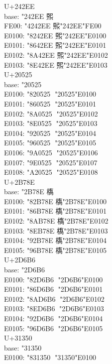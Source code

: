 \documentclass{ujarticle}
\begin{document}
\begin{multicols*}{4}
\newcolumn
U+242EE\\
base: \kchar"242EE 𤋮\\
FE00: \kchar"4242EE  𤋮︀\kchar"242EE\kchar"FE00\\
E0100: \kchar"8242EE 𤋮󠄀\kchar"242EE\kchar"E0100\\
E0101: \kchar"8642EE 𤋮󠄁\kchar"242EE\kchar"E0101\\
E0102: \kchar"8A42EE 𤋮󠄂\kchar"242EE\kchar"E0102\\
E0103: \kchar"8E42EE 𤋮󠄃\kchar"242EE\kchar"E0103\\
\VS
U+20525\\
base: \kchar"20525 𠔥\\
E0100: \kchar"820525 𠔥󠄀\kchar"20525\kchar"E0100\\
E0101: \kchar"860525 𠔥󠄁\kchar"20525\kchar"E0101\\
E0102: \kchar"8A0525 𠔥󠄂\kchar"20525\kchar"E0102\\
E0103: \kchar"8E0525 𠔥󠄃\kchar"20525\kchar"E0103\\
E0104: \kchar"920525 𠔥󠄄\kchar"20525\kchar"E0104\\
E0105: \kchar"960525 𠔥󠄅\kchar"20525\kchar"E0105\\
E0106: \kchar"9A0525 𠔥󠄆\kchar"20525\kchar"E0106\\
E0107: \kchar"9E0525 𠔥󠄇\kchar"20525\kchar"E0107\\
E0108: \kchar"A20525 𠔥󠄈\kchar"20525\kchar"E0108\\
\VS
U+2B78E\\
base: \kchar"2B78E 𫞎\\
E0100: \kchar"82B78E 𫞎󠄀\kchar"2B78E\kchar"E0100\\
E0101: \kchar"86B78E 𫞎󠄁\kchar"2B78E\kchar"E0101\\
E0102: \kchar"8AB78E 𫞎󠄂\kchar"2B78E\kchar"E0102\\
E0103: \kchar"8EB78E 𫞎󠄃\kchar"2B78E\kchar"E0103\\
E0104: \kchar"92B78E 𫞎󠄄\kchar"2B78E\kchar"E0104\\
E0105: \kchar"96B78E 𫞎󠄅\kchar"2B78E\kchar"E0105\\
\VS
U+2D6B6\\
base: \kchar"2D6B6 𭚶\\
E0100: \kchar"82D6B6 𭚶󠄀\kchar"2D6B6\kchar"E0100\\
E0101: \kchar"86D6B6 𭚶󠄁\kchar"2D6B6\kchar"E0101\\
E0102: \kchar"8AD6B6 𭚶󠄂\kchar"2D6B6\kchar"E0102\\
E0103: \kchar"8ED6B6 𭚶󠄃\kchar"2D6B6\kchar"E0103\\
E0104: \kchar"92D6B6 𭚶󠄄\kchar"2D6B6\kchar"E0104\\
E0105: \kchar"96D6B6 𭚶󠄅\kchar"2D6B6\kchar"E0105\\
\VS
U+31350\\
base: \kchar"31350 𱍐\\
E0100: \kchar"831350 𱍐󠄀\kchar"31350\kchar"E0100\\

%
%
%

\end{multicols*}
\end{document}

